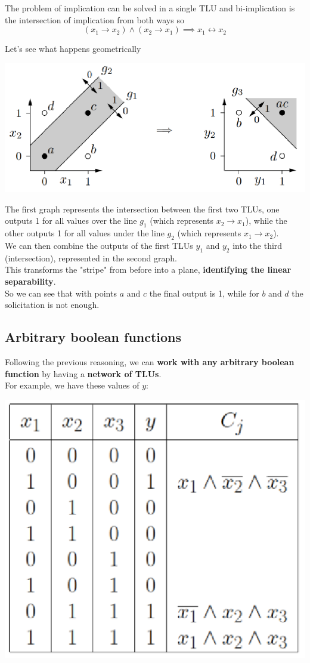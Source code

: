 \documentclass[11pt]{article}
\begin{document}
		The problem of implication can be solved in a single TLU and bi-implication is the intersection of implication from both ways so
		$$ (x_1 \rightarrow x_2) \wedge (x_2 \rightarrow x_1) \implies x_1 \leftrightarrow x_2$$
		
		\newpage
		
		Let's see what happens geometrically
		\begin{center}
			\includegraphics[width=0.85\columnwidth]{img/NN/TLU9}
		\end{center}
		The first graph represents the intersection between the first two TLUs, one outputs 1 for all values over the line $g_1$ (which represents $x_2 \rightarrow x_1$), while the other outputs 1 for all values under the line $g_2$ (which represents $x_1 \rightarrow x_2$).\\
		
		We can then combine the outputs of the first TLUs $y_1$ and $y_2$ into the third (intersection), represented in the second graph. \\
		This transforms the "stripe" from before into a plane, \textbf{identifying the linear separability}.\\
		
		So we can see that with points $a$ and $c$ the final output is 1, while for $b$ and $d$ the solicitation is not enough.\\
		
		\newpage
		
		\subsection{Arbitrary boolean functions}
		Following the previous reasoning, we can \textbf{work with any arbitrary boolean function} by having a \textbf{network of TLUs}.\\
		
		For example, we have these values of $y$:
		\begin{center}
			\includegraphics[width=0.35\columnwidth]{img/NN/ABF1}
		\end{center}
		
\end{document}
